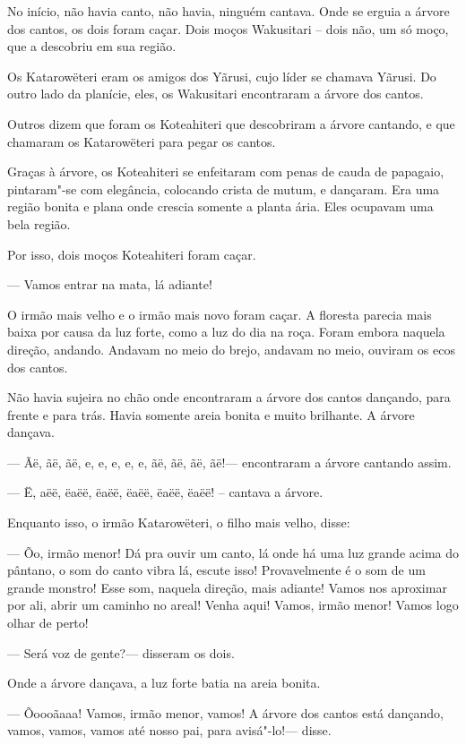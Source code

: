  

 No início, não havia canto, não havia, ninguém
cantava. Onde se erguia a árvore dos cantos, os dois foram caçar. Dois
moços Wakusitari -- dois não, um só moço, que a descobriu em sua região.

Os Katarowëteri eram os amigos dos Yãrusi, cujo líder se chamava Yãrusi.
Do outro lado da planície, eles, os Wakusitari encontraram a árvore dos
cantos. 

Outros dizem que foram os Koteahiteri que descobriram a árvore cantando,
e que chamaram os Katarowëteri para pegar os cantos. 

Graças à árvore, os Koteahiteri se enfeitaram com penas de cauda de
papagaio, pintaram"-se com elegância, colocando crista de mutum, e
dançaram. Era uma região bonita e plana onde crescia somente a planta
ária. Eles ocupavam uma bela região. 

Por isso, dois moços Koteahiteri foram caçar. 

--- Vamos entrar na mata, lá adiante! 

O irmão mais velho e o irmão mais novo foram caçar. A floresta parecia
mais baixa por causa da luz forte, como a luz do dia na roça. Foram
embora naquela direção, andando. Andavam no meio do brejo, andavam no
meio, ouviram os ecos dos cantos. 

Não havia sujeira no chão onde encontraram a árvore dos cantos dançando,
para frente e para trás. Havia somente areia bonita e muito brilhante. A
árvore dançava. 

--- Ãë, ãë, ãë, e, e, e, e, e, ãë, ãë, ãë, ãë!--- encontraram a árvore
cantando assim. 

--- Ë, aëë, ëaëë, ëaëë, ëaëë, ëaëë, ëaëë! -- cantava a árvore. 

Enquanto isso, o irmão Katarowëteri, o filho mais velho, disse: 

--- Õo, irmão menor! Dá pra ouvir um canto, lá onde há uma luz grande
acima do pântano, o som do canto vibra lá, escute isso! Provavelmente é
o som de um grande monstro! Esse som, naquela direção, mais adiante!
Vamos nos aproximar por ali, abrir um caminho no areal! Venha aqui!
Vamos, irmão menor! Vamos logo olhar de perto! 

--- Será voz de gente?--- disseram os dois. 

Onde a árvore dançava, a luz forte batia na areia bonita. 

--- Õoooãaaa! Vamos, irmão menor, vamos! A árvore dos cantos está
dançando, vamos, vamos, vamos até nosso pai, para avisá"-lo!--- disse. 

